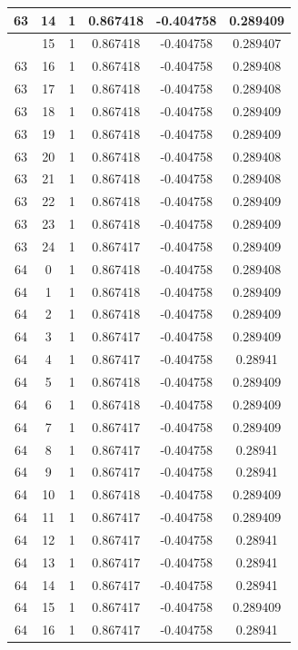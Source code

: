\documentclass[12pt,a4paper]{article}
\numberwithin{equation}{section}
\numberwithin{figure}{section}
\numberwithin{table}{section}
\begin{document}
\begin{longtable}{|c|c|c|c|c|c|}
63 & 14 & 1 & 0.867418 & -0.404758 & 0.289409 \\ \hline
\pagebreak
63 & 15 & 1 & 0.867418 & -0.404758 & 0.289407 \\ \hline
63 & 16 & 1 & 0.867418 & -0.404758 & 0.289408 \\ \hline
63 & 17 & 1 & 0.867418 & -0.404758 & 0.289408 \\ \hline
63 & 18 & 1 & 0.867418 & -0.404758 & 0.289409 \\ \hline
63 & 19 & 1 & 0.867418 & -0.404758 & 0.289409 \\ \hline
63 & 20 & 1 & 0.867418 & -0.404758 & 0.289408 \\ \hline
63 & 21 & 1 & 0.867418 & -0.404758 & 0.289408 \\ \hline
63 & 22 & 1 & 0.867418 & -0.404758 & 0.289409 \\ \hline
63 & 23 & 1 & 0.867418 & -0.404758 & 0.289409 \\ \hline
63 & 24 & 1 & 0.867417 & -0.404758 & 0.289409 \\ \hline
64 & 0 & 1 & 0.867418 & -0.404758 & 0.289408 \\ \hline
64 & 1 & 1 & 0.867418 & -0.404758 & 0.289409 \\ \hline
64 & 2 & 1 & 0.867418 & -0.404758 & 0.289409 \\ \hline
64 & 3 & 1 & 0.867417 & -0.404758 & 0.289409 \\ \hline
64 & 4 & 1 & 0.867417 & -0.404758 & 0.28941 \\ \hline
64 & 5 & 1 & 0.867418 & -0.404758 & 0.289409 \\ \hline
64 & 6 & 1 & 0.867418 & -0.404758 & 0.289409 \\ \hline
64 & 7 & 1 & 0.867417 & -0.404758 & 0.289409 \\ \hline
64 & 8 & 1 & 0.867417 & -0.404758 & 0.28941 \\ \hline
64 & 9 & 1 & 0.867417 & -0.404758 & 0.28941 \\ \hline
64 & 10 & 1 & 0.867418 & -0.404758 & 0.289409 \\ \hline
64 & 11 & 1 & 0.867417 & -0.404758 & 0.289409 \\ \hline
64 & 12 & 1 & 0.867417 & -0.404758 & 0.28941 \\ \hline
64 & 13 & 1 & 0.867417 & -0.404758 & 0.28941 \\ \hline
64 & 14 & 1 & 0.867417 & -0.404758 & 0.28941 \\ \hline
64 & 15 & 1 & 0.867417 & -0.404758 & 0.289409 \\ \hline
64 & 16 & 1 & 0.867417 & -0.404758 & 0.28941 \\ \hline

\end{longtable}
\end{document}
